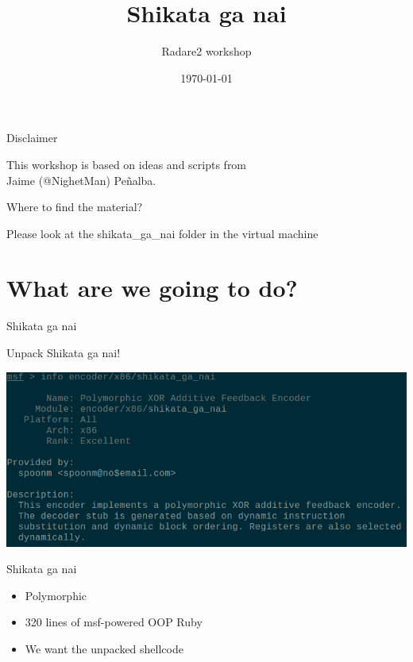 \documentclass{beamer}
\title{Shikata ga nai}
\author{Radare2 workshop}
\date{\today}
\institute{hack.lu 2015}
\begin{document}
\maketitle

\begin{frame}{Disclaimer}
	\begin{center}
		This workshop is based on ideas and scripts from\\
		Jaime (\alert{@NighetMan}) Peñalba.
	\end{center}
\end{frame}

\begin{frame}{Where to find the material?}
	\begin{center}
		Please look at the \alert{shikata\_ga\_nai} folder in the virtual machine
	\end{center}
\end{frame}

\section{What are we going to do?}

\begin{frame}{Shikata ga nai}
	\begin{center}
		Unpack \alert{Shikata ga nai}!
	\end{center}
	\includegraphics[width=\textwidth]{description.png}
\end{frame}

\begin{frame}{Shikata ga nai}
	\begin{itemize}
		\item Polymorphic
		\item 320 lines of msf-powered OOP Ruby
		\item We want the unpacked shellcode
	\end{itemize}
\end{frame}
\end{document}
